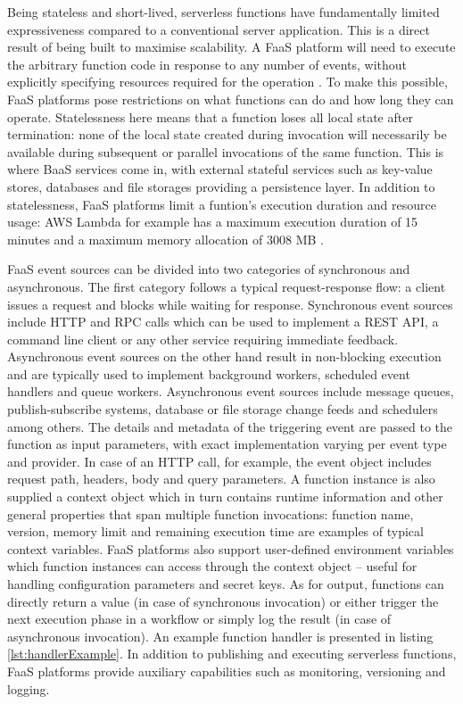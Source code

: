 Being stateless and short-lived, serverless functions have fundamentally limited expressiveness compared to a conventional server application. This is a direct result of being built to maximise scalability. A FaaS platform will need to execute the arbitrary function code in response to any number of events, without explicitly specifying resources required for the operation \parencite{buyya2017manifesto}. To make this possible, FaaS platforms pose restrictions on what functions can do and how long they can operate. Statelessness here means that a function loses all local state after termination: none of the local state created during invocation will necessarily be available during subsequent or parallel invocations of the same function. This is where BaaS services come in, with external stateful services such as key-value stores, databases and file storages providing a persistence layer. In addition to statelessness, FaaS platforms limit a funtion's execution duration and resource usage: AWS Lambda for example has a maximum execution duration of 15 minutes and a maximum memory allocation of 3008 MB \parencite{awslambda0218}.

FaaS event sources can be divided into two categories of synchronous and asynchronous. The first category follows a typical request-response flow: a client issues a request and blocks while waiting for response. Synchronous event sources include HTTP and RPC calls which can be used to implement a REST API, a command line client or any other service requiring immediate feedback. Asynchronous event sources on the other hand result in non-blocking execution and are typically used to implement background workers, scheduled event handlers and queue workers. Asynchronous event sources include message queues, publish-subscribe systems, database or file storage change feeds and schedulers among others. The details and metadata of the triggering event are passed to the function as input parameters, with exact implementation varying per event type and provider. In case of an HTTP call, for example, the event object includes request path, headers, body and query parameters. A function instance is also supplied a context object which in turn contains runtime information and other general properties that span multiple function invocations: function name, version, memory limit and remaining execution time are examples of typical context variables. FaaS platforms also support user-defined environment variables which function instances can access through the context object -- useful for handling configuration parameters and secret keys. As for output, functions can directly return a value (in case of synchronous invocation) or either trigger the next execution phase in a workflow or simply log the result (in case of asynchronous invocation). An example function handler is presented in listing \ref{lst:handlerExample}. In addition to publishing and executing serverless functions, FaaS platforms provide auxiliary capabilities such as monitoring, versioning and logging. \parencite{cncf18serverlessWG}

